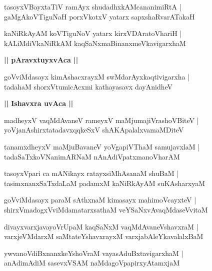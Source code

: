 \documentclass[twoside,12pt,openright]{book}
\newcounter{shloka}[chapter]
\def\uvaca#1{\centerline{{\large\textbf{#1}}}}
\begin{document}
\begin{shloka}%
tasoyxVBayxtaTiV ramAyx shudadhxkAMcananimiRtA |\\
gaMgAkoVTiguNaH porxVkotxV yatarx sapxshaRvarATakaH 
\end{shloka}

\begin{shloka}%
kaNiRkAyAM koVTiguNoV yatarx kirxVDAratoVhariH |\\
kALiMdiVkaNiRkAM kaqSaNxmaBinanxmeVkavigarxhaM 
\end{shloka}

\uvaca{|| pAravxtuyxvAca ||}

\begin{shloka}%
goVviMdasayx kimAshacxrayxM swMdarAyxkaqtivigarxha |\\
tadahaM shorxVtumicAcxmi kathayasavx dayAnidheV 
\end{shloka}

\uvaca {|| Ishavxra uvAca ||}

\begin{shloka}%
madheyxV vaqMdAvaneV rameyxV maMjumajiVrashoVBiteV |\\
yoVjanAshirxtatadavxqqkeSxV shAKApalalxvamaMDiteV 
\end{shloka}

\begin{shloka}%
tanamxdheyxV maMjuBavaneV yoVgapiVThaM samujavxlaM |\\
tadaSaTxkoVNanimARNaM nAnAdiVpatxmanoVharAM 
\end{shloka}

\begin{shloka}%
tasoyxVpari ca mANikayx ratayxsiMhAsanaM shuBaM |\\
tasimxnanxSaTxdaLaM padamxM kaNiRkAyAM suKAsharxyaM 
\end{shloka}

\begin{shloka}%
goVviMdasayx paraM sAthxnaM kimasayx mahimoVcayxteV |\\
shirxVmadogxVviMdamatarxsathaM veYSaNxvAvaqMdaseVvitaM 
\end{shloka}

\begin{shloka}%
divayxvarxjavayoVrUpaM kaqSaNxM vaqMdAvaneVshavxraM |\\
varxjeVMdarxM saMtateYshavxrayxM varxjabAleYkavalalxBaM 
\end{shloka}

\begin{shloka}%
ywvanoVdiBxnanxkeYshoVraM vayasAduBxtavigarxhaM |\\
anAdimAdiM sasevxVSAM naMdagoVpapirxyAtamxjaM 
\end{shloka}
\end{document}
